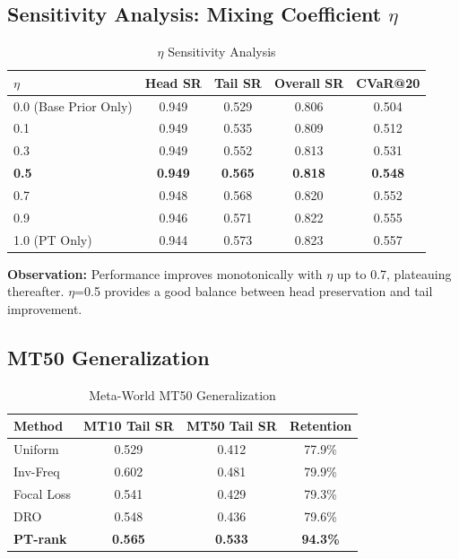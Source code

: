 \documentclass[11pt, a4paper, oneside]{article}
\theoremstyle{plain}
\theoremstyle{break}
\theoremstyle{plain}
\theoremstyle{breakdef}
\theoremstyle{plain}
\theoremstyle{breakrem}
\theoremstyle{plain}
\theoremstyle{breakrem}
\begin{document}
\subsection{Sensitivity Analysis: Mixing Coefficient $\eta$}

\begin{table}[htbp]
\centering
\caption{$\eta$ Sensitivity Analysis}
\label{tab:eta}
\begin{tabular}{lcccc}
\toprule
$\eta$ & Head SR & Tail SR & Overall SR & CVaR@20 \\
\midrule
0.0 (Base Prior Only) & 0.949 & 0.529 & 0.806 & 0.504 \\
0.1 & 0.949 & 0.535 & 0.809 & 0.512 \\
0.3 & 0.949 & 0.552 & 0.813 & 0.531 \\
\textbf{0.5} & \textbf{0.949} & \textbf{0.565} & \textbf{0.818} & \textbf{0.548} \\
0.7 & 0.948 & 0.568 & 0.820 & 0.552 \\
0.9 & 0.946 & 0.571 & 0.822 & 0.555 \\
1.0 (PT Only) & 0.944 & 0.573 & 0.823 & 0.557 \\
\bottomrule
\end{tabular}
\end{table}

\textbf{Observation:} Performance improves monotonically with $\eta$ up to 0.7, plateauing thereafter. $\eta$=0.5 provides a good balance between head preservation and tail improvement.

\pagebreak

\subsection{MT50 Generalization}

\begin{table}[htbp]
\centering
\caption{Meta-World MT50 Generalization}
\label{tab:mt50}
\begin{tabular}{lccc}
\toprule
Method & MT10 Tail SR & MT50 Tail SR & Retention \\
\midrule
Uniform & 0.529 & 0.412 & 77.9\% \\
Inv-Freq & 0.602 & 0.481 & 79.9\% \\
Focal Loss & 0.541 & 0.429 & 79.3\% \\
DRO & 0.548 & 0.436 & 79.6\% \\
\rowcolor{green!10}\textbf{PT-rank} & \textbf{0.565} & \textbf{0.533} & \textbf{94.3\%} \\
\bottomrule
\end{tabular}
\end{table}
\end{document}
